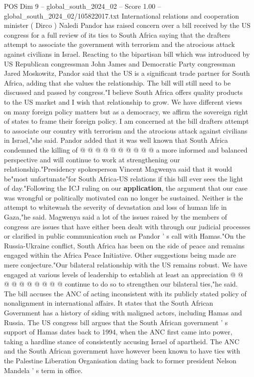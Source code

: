 \begin{textsample}{POS Dim 9 – global\_south\_2024\_02 – Score 1.00 – global\_south\_2024\_02/105822017.txt}  \label{ex:f9_pos_104}
International relations and cooperation minister ( Dirco ) Naledi Pandor has raised concern over a bill received by the US congress for a full review of its ties to South Africa saying that the drafters attempt to associate the government with terrorism and the atrocious attack against civilians in Israel.
Reacting to the bipartisan bill which was introduced by US Republican congressman John James and Democratic Party congressman Jared Moskowitz, Pandor said that the US is a significant trade partner for South Africa, adding that she values the relationship.
The bill will still need to be discussed and passed by congress."I believe South Africa offers quality products to the US market and I wish that relationship to grow.
We have different views on many foreign policy matters but as a democracy, we affirm the sovereign right of states to frame their foreign policy.
I am concerned at the bill drafters attempt to associate our country with terrorism and the atrocious attack against civilians in Israel,"she said.
Pandor added that it was well known that South Africa condemned the killing of @ @ @ @ @ @ @ @ @ @ a more informed and balanced perspective and will continue to work at strengthening our relationship."Presidency spokesperson Vincent Magwenya said that it would be"most unfortunate"for South Africa-US relations if this bill ever sees the light of day."Following the ICJ ruling on our \textbf{application}, the argument that our case was wrongful or politically motivated can no longer be sustained.
Neither is the attempt to whitewash the severity of devastation and loss of human life in Gaza,"he said.
Magwenya said a lot of the issues raised by the members of congress are issues that have either been dealt with through our judicial processes or clarified in public communication such as Pandor ' s call with Hamas."On the Russia-Ukraine conflict, South Africa has been on the side of peace and remains engaged within the Africa Peace Initiative.
Other suggestions being made are mere conjecture."Our bilateral relationship with the US remains robust.
We have engaged at various levels of leadership to establish at least an appreciation @ @ @ @ @ @ @ @ @ @ continue to do so to strengthen our bilateral ties,"he said.
The bill accuses the ANC of acting inconsistent with its publicly stated policy of nonalignment in international affairs.
It states that the South African Government has a history of siding with maligned actors, including Hamas and Russia.
The US congress bill argues that the South African government ' s support of Hamas dates back to 1994, when the ANC first came into power, taking a hardline stance of consistently accusing Israel of apartheid.
The ANC and the South African government have however been known to have ties with the Palestine Liberation Organisation dating back to former president Nelson Mandela ' s term in office.

\end{textsample}
